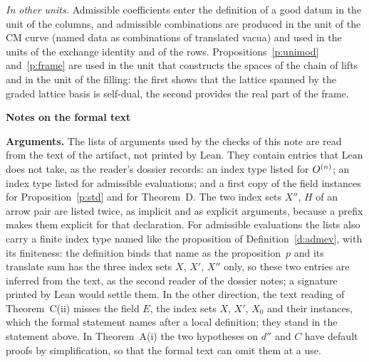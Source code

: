 \documentclass[11pt,a4paper]{article}
\newcommand{\m}[1]{\mbox{$#1$}}        %
\newcommand{\sect}[2]{\refstepcounter{section}\label{#2}\par\addvspace{19pt plus 4pt minus 2pt}\Needspace{7\baselineskip}%
  \noindent\llap{{\fontsize{13.2}{16}\selectfont\bfseries\color{inkfaint}\thesection}\hspace{9pt}}%
  {\fontsize{13.2}{16}\selectfont\bfseries\color{ink}#1}\par\nopagebreak\vspace{-1pt}}
\newcommand{\subhead}[1]{\par\addvspace{9pt plus 2pt}\Needspace{4\baselineskip}\noindent\textbf{#1}\enspace\ignorespaces}
\theoremstyle{plainx}
\theoremstyle{uprightx}
\begin{document}
\emph{In other units.} Admissible coefficients enter the definition of a good datum in the unit of the columns,
and admissible combinations are produced in the unit of the CM curve (named data as combinations of translated
vacua) and used in the units of the exchange identity and of the rows. Propositions~\ref{p:unimod}
and~\ref{p:frame} are used in the unit that constructs the spaces of the chain of lifts and in the unit of the filling:
the first shows that the lattice spanned by the graded lattice basis is self-dual, the second provides the real
part of the frame.

\sect{Notes on the formal text}{s:notes}
\subhead{Arguments.} The lists of arguments used by the checks of this note are read from the text of the
artifact, not printed by Lean. They contain entries that Lean does not take, as the reader's dossier records: an index
type listed for \m{\intaw{n}}; an index type listed for admissible evaluations; and a first copy of the field
instances for Proposition~\ref{p:std} and for Theorem~D. The two index sets $X''$, $H$ of an arrow pair are listed
twice, as implicit and as explicit arguments, because a prefix makes them explicit for that declaration. For
admissible evaluations the lists also carry a finite index type named like the proposition of
Definition~\ref{d:admev}, with its finiteness: the definition binds that name as the proposition~$p$ and its
translate sum has the three index sets $X$, $X'$, $X''$ only, so these two entries are inferred from the text, as
the second reader of the dossier notes; a signature printed by Lean would settle them. In the other direction, the text reading of Theorem~C(ii) misses the field $E$, the index sets $X$,
$X'$, $X_0$ and their instances, which the formal statement names after a local definition; they stand in the
statement above. In Theorem~A(i) the two hypotheses on $d''$ and $C$ have default proofs by simplification, so
that the formal text can omit them at a use.
\end{document}
